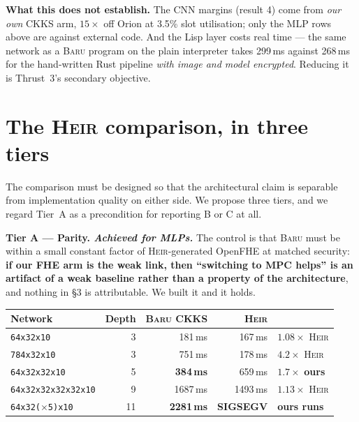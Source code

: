 \documentclass[10pt]{article}
\newcommand{\baru}{\textsc{Baru}}
\newcommand{\heir}{\textsc{Heir}}
\begin{document}
\medskip
\noindent\textbf{What this does not establish.} The CNN margins (result 4) come
from \emph{our own} CKKS arm, $15\times$ off Orion at 3.5\% slot utilisation;
only the MLP rows above are against external code. And the Lisp layer costs real
time --- the same network as a \baru{} program on the plain interpreter takes
299\,ms against 268\,ms for the hand-written Rust pipeline \emph{with image and
model encrypted}. Reducing it is Thrust~3's secondary objective.

\section{The \heir{} comparison, in three tiers}

The comparison must be designed so that the architectural claim is separable
from implementation quality on either side. We propose three tiers, and we
regard Tier~A as a precondition for reporting B or C at all.

\medskip
\noindent\textbf{Tier A --- Parity. \emph{Achieved for MLPs.}} The control is
that \baru{} must be within a small constant factor of \heir{}-generated OpenFHE
at matched security: \textbf{if our FHE arm is the weak link, then ``switching to
MPC helps'' is an artifact of a weak baseline rather than a property of the
architecture}, and nothing in §3 is attributable. We built it and it holds.

\begin{center}\small
\begin{tabular}{@{}lrrrl@{}}
\toprule
\textbf{Network} & \textbf{Depth} & \textbf{\baru{} CKKS} & \textbf{\heir{}} & \\
\midrule
\texttt{64x32x10}            & 3  & 181\,ms & 167\,ms & $1.08\times$ \heir{} \\
\texttt{784x32x10}           & 3  & 751\,ms & 178\,ms & $4.2\times$ \heir{} \\
\texttt{64x32x32x10}         & 5  & \textbf{384\,ms} & 659\,ms & $\mathbf{1.7\times}$ \textbf{ours} \\
\texttt{64x32x32x32x32x10}   & 9  & 1687\,ms & 1493\,ms & $1.13\times$ \heir{} \\
\texttt{64x32($\times$5)x10} & 11 & \textbf{2281\,ms} & \textbf{SIGSEGV} & \textbf{ours runs} \\
\bottomrule
\end{tabular}
\end{center}
\end{document}
